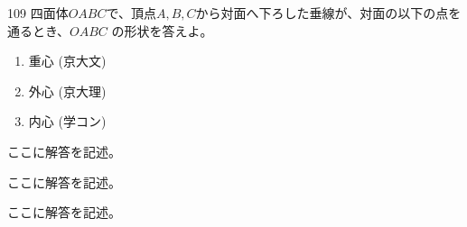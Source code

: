 \begin{thm}{109}{}{}
 四面体$OABC$で、頂点$A, B, C$から対面へ下ろした垂線が、対面の以下の点を通るとき、$OABC$ の形状を答えよ。
 \begin{enumerate}
  \item 重心  (京大文)
  \item 外心  (京大理)
  \item 内心  (学コン)
 \end{enumerate}
\end{thm}

ここに解答を記述。

ここに解答を記述。

ここに解答を記述。